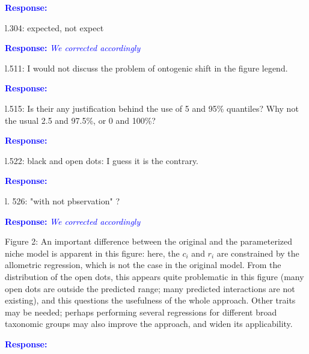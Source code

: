 \documentclass [12pt,onecolumn,twoside,openright]{report}
\begin{document}
\begin{onehalfspacing}
\textcolor{blue}{\textbf{Response:}} \textit{\textcolor{blue}{}}

\medskip l.304: expected, not expect

\textcolor{blue}{\textbf{Response:}} \textit{\textcolor{blue}{We corrected accordingly}}

\medskip l.511: I would not discuss the problem of ontogenic
shift in the figure legend.

\textcolor{blue}{\textbf{Response:}} \textit{\textcolor{blue}{}}

\medskip l.515: Is their any justification behind the use of 5
and 95\% quantiles? Why not the usual 2.5 and 97.5\%, or 0 and 100\%?

\textcolor{blue}{\textbf{Response:}} \textit{\textcolor{blue}{}}

\medskip l.522: black and open dots: I guess it is the
contrary.

\textcolor{blue}{\textbf{Response:}} \textit{\textcolor{blue}{}}

\medskip l. 526: "with not pbservation" ?

\textcolor{blue}{\textbf{Response:}} \textit{\textcolor{blue}{We corrected accordingly}}

\medskip Figure 2: An important difference between the
original and the parameterized niche model is apparent in this figure: here, the
$c_i$ and $r_i$ are constrained by the allometric regression, which is not the
case in the original model. From the distribution of the open dots, this appears
quite problematic in this figure (many open dots are outside the predicted
range; many predicted interactions are not existing), and this questions the
usefulness of the whole approach. Other traits may be needed; perhaps performing
several regressions for different broad taxonomic groups may also improve the
approach, and widen its applicability.

\textcolor{blue}{\textbf{Response:}} \textit{\textcolor{blue}{}}




\end{onehalfspacing}
\end{document}
